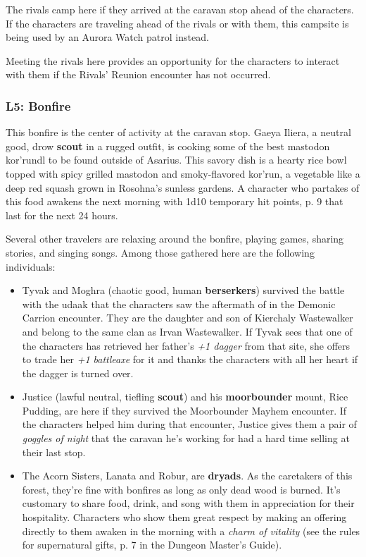 \documentclass[a4paper, 11pt, bg=full, twocolumn, nooutline]{dndbook}
\begin{document}
The rivals camp here if they arrived at the caravan stop ahead of the characters. If the characters are traveling ahead of the rivals or with them, this campsite is being used by an Aurora Watch patrol instead.

Meeting the rivals here provides an opportunity for the characters to interact with them if the Rivals' Reunion encounter has not occurred.

\subsubsection{L5: Bonfire}

This bonfire is the center of activity at the caravan stop. Gaeya Iliera, a neutral good, drow \textbf{scout} in a rugged outfit, is cooking some of the best mastodon kor'rundl to be found outside of Asarius. This savory dish is a hearty rice bowl topped with spicy grilled mastodon and smoky-flavored kor'run, a vegetable like a deep red squash grown in Rosohna's sunless gardens. A character who partakes of this food awakens the next morning with 1d10 temporary hit points, p. 9 that last for the next 24 hours.

Several other travelers are relaxing around the bonfire, playing games, sharing stories, and singing songs. Among those gathered here are the following individuals:

\begin{itemize}
\item Tyvak and Moghra (chaotic good, human \textbf{berserkers}) survived the battle with the udaak that the characters saw the aftermath of in the Demonic Carrion encounter. They are the daughter and son of Kierchaly Wastewalker and belong to the same clan as Irvan Wastewalker. If Tyvak sees that one of the characters has retrieved her father's \textit{+1 dagger} from that site, she offers to trade her \textit{+1 battleaxe} for it and thanks the characters with all her heart if the dagger is turned over.
\item Justice (lawful neutral, tiefling \textbf{scout}) and his \textbf{moorbounder} mount, Rice Pudding, are here if they survived the Moorbounder Mayhem encounter. If the characters helped him during that encounter, Justice gives them a pair of \textit{goggles of night} that the caravan he's working for had a hard time selling at their last stop.
\item The Acorn Sisters, Lanata and Robur, are \textbf{dryads}. As the caretakers of this forest, they're fine with bonfires as long as only dead wood is burned. It's customary to share food, drink, and song with them in appreciation for their hospitality. Characters who show them great respect by making an offering directly to them awaken in the morning with a \textit{charm of vitality} (see the rules for supernatural gifts, p. 7 in the Dungeon Master's Guide).
\end{itemize}
\end{document}
